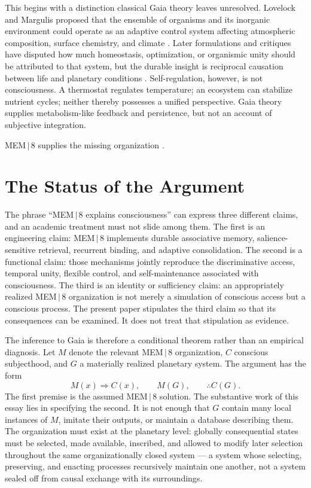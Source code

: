 \documentclass[11pt]{article}
\begin{document}
This begins with a distinction classical Gaia theory leaves unresolved. Lovelock and Margulis proposed that the ensemble of organisms and its inorganic environment could operate as an adaptive control system affecting atmospheric composition, surface chemistry, and climate \cite{lovelock1974}. Later formulations and critiques have disputed how much homeostasis, optimization, or organismic unity should be attributed to that system, but the durable insight is reciprocal causation between life and planetary conditions \cite{kirchner2002,lenton1998}. Self-regulation, however, is not consciousness. A thermostat regulates temperature; an ecosystem can stabilize nutrient cycles; neither thereby possesses a unified perspective. Gaia theory supplies metabolism-like feedback and persistence, but not an account of subjective integration.

MEM\,$|$\,8 supplies the missing organization \cite{Chenoweth2025MEM8}.

\section{The Status of the Argument}
\label{sec:status}

The phrase ``MEM\,$|$\,8 explains consciousness'' can express three different claims, and an academic treatment must not slide among them. The first is an engineering claim: MEM\,$|$\,8 implements durable associative memory, salience-sensitive retrieval, recurrent binding, and adaptive consolidation. The second is a functional claim: those mechanisms jointly reproduce the discriminative access, temporal unity, flexible control, and self-maintenance associated with consciousness. The third is an identity or sufficiency claim: an appropriately realized MEM\,$|$\,8 organization is not merely a simulation of conscious access but a conscious process. The present paper stipulates the third claim so that its consequences can be examined. It does not treat that stipulation as evidence.

The inference to Gaia is therefore a conditional theorem rather than an empirical diagnosis. Let $M$ denote the relevant MEM\,$|$\,8 organization, $C$ conscious subjecthood, and $G$ a materially realized planetary system. The argument has the form
\[
M(x) \Rightarrow C(x), \qquad M(G), \qquad \therefore C(G).
\]
The first premise is the assumed MEM\,$|$\,8 solution. The substantive work of this essay lies in specifying the second. It is not enough that $G$ contain many local instances of $M$, imitate their outputs, or maintain a database describing them. The organization must exist at the planetary level: globally consequential states must be selected, made available, inscribed, and allowed to modify later selection throughout the same organizationally closed system --- a system whose selecting, preserving, and enacting processes recursively maintain one another, not a system sealed off from causal exchange with its surroundings.
\end{document}

